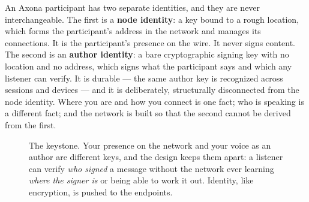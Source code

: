 \documentclass[nobib,justified]{tufte-handout}
\begin{document}
An Axona participant has two separate identities, and they are never
interchangeable. The first is a \textbf{node identity}: a key bound to a rough
location, which forms the participant's address in the network and manages its
connections. It is the participant's presence on the wire. It never signs
content. The second is an \textbf{author identity}: a bare cryptographic
signing key with no location and no address, which signs what the participant
says and which any listener can verify. It is durable --- the same author key
is recognized across sessions and devices --- and it is deliberately,
structurally disconnected from the node identity. Where you are and how you
connect is one fact; who is speaking is a different fact; and the network is
built so that the second cannot be derived from the first.

\begin{figure}[h]
\centering
{}
\caption[Two identities]{The keystone. Your presence on the network and your
voice as an author are different keys, and the design keeps them apart: a
listener can verify \emph{who signed} a message without the network ever
learning \emph{where the signer is} or being able to work it out. Identity, like
encryption, is pushed to the endpoints.}
\label{fig:identity}
\end{figure}
\end{document}
